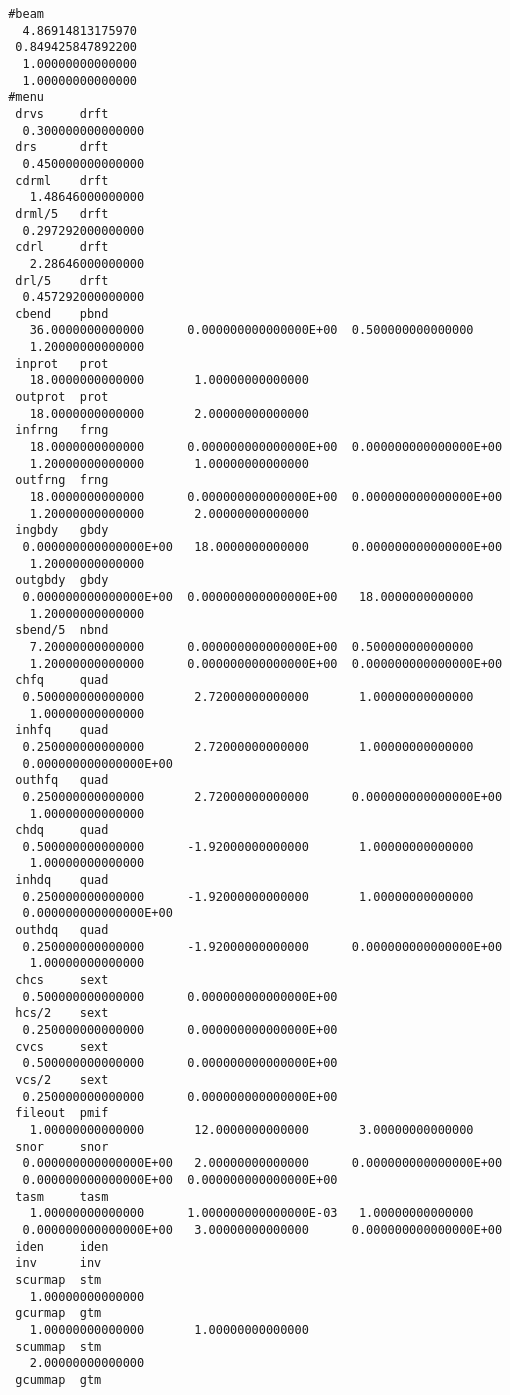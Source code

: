 \begin{footnotesize}
\begin{verbatim}
 #beam
   4.86914813175970
  0.849425847892200
   1.00000000000000
   1.00000000000000
 #menu
  drvs     drft
   0.300000000000000
  drs      drft
   0.450000000000000
  cdrml    drft
    1.48646000000000
  drml/5   drft
   0.297292000000000
  cdrl     drft
    2.28646000000000
  drl/5    drft
   0.457292000000000
  cbend    pbnd
    36.0000000000000      0.000000000000000E+00  0.500000000000000
    1.20000000000000
  inprot   prot
    18.0000000000000       1.00000000000000
  outprot  prot
    18.0000000000000       2.00000000000000
  infrng   frng
    18.0000000000000      0.000000000000000E+00  0.000000000000000E+00
    1.20000000000000       1.00000000000000
  outfrng  frng
    18.0000000000000      0.000000000000000E+00  0.000000000000000E+00
    1.20000000000000       2.00000000000000
  ingbdy   gbdy
   0.000000000000000E+00   18.0000000000000      0.000000000000000E+00
    1.20000000000000
  outgbdy  gbdy
   0.000000000000000E+00  0.000000000000000E+00   18.0000000000000
    1.20000000000000
  sbend/5  nbnd
    7.20000000000000      0.000000000000000E+00  0.500000000000000
    1.20000000000000      0.000000000000000E+00  0.000000000000000E+00
  chfq     quad
   0.500000000000000       2.72000000000000       1.00000000000000
    1.00000000000000
  inhfq    quad
   0.250000000000000       2.72000000000000       1.00000000000000
   0.000000000000000E+00
  outhfq   quad
   0.250000000000000       2.72000000000000      0.000000000000000E+00
    1.00000000000000
  chdq     quad
   0.500000000000000      -1.92000000000000       1.00000000000000
    1.00000000000000
  inhdq    quad
   0.250000000000000      -1.92000000000000       1.00000000000000
   0.000000000000000E+00
  outhdq   quad
   0.250000000000000      -1.92000000000000      0.000000000000000E+00
    1.00000000000000
  chcs     sext
   0.500000000000000      0.000000000000000E+00
  hcs/2    sext
   0.250000000000000      0.000000000000000E+00
  cvcs     sext
   0.500000000000000      0.000000000000000E+00
  vcs/2    sext
   0.250000000000000      0.000000000000000E+00
  fileout  pmif
    1.00000000000000       12.0000000000000       3.00000000000000
  snor     snor
   0.000000000000000E+00   2.00000000000000      0.000000000000000E+00
   0.000000000000000E+00  0.000000000000000E+00
  tasm     tasm
    1.00000000000000      1.000000000000000E-03   1.00000000000000
   0.000000000000000E+00   3.00000000000000      0.000000000000000E+00
  iden     iden
  inv      inv
  scurmap  stm
    1.00000000000000
  gcurmap  gtm
    1.00000000000000       1.00000000000000
  scummap  stm
    2.00000000000000
  gcummap  gtm

\end{verbatim}
\end{footnotesize}

